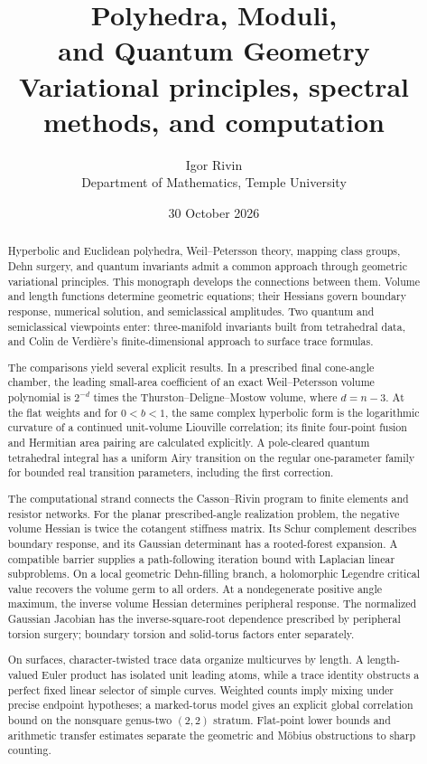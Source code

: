 \documentclass[11pt,a4paper]{article}
\title{\textbf{Polyhedra, Moduli,\\and Quantum Geometry}\\[8pt]
\large Variational principles, spectral methods, and computation}
\author{Igor Rivin\\[3pt]
\normalsize Department of Mathematics, Temple University}
\date{30 October 2026}
\numberwithin{equation}{section}
\theoremstyle{definition}
\theoremstyle{remark}
\begin{document}
\maketitle
\thispagestyle{plain}

\begin{abstract}
Hyperbolic and Euclidean polyhedra, Weil--Petersson theory, mapping class
groups, Dehn surgery, and quantum invariants admit a common approach
through geometric variational principles. This monograph develops the
connections between them. Volume and length functions determine geometric
equations; their Hessians govern boundary response, numerical solution,
and semiclassical amplitudes. Two quantum and semiclassical viewpoints
enter: three-manifold invariants built from tetrahedral data, and Colin
de Verdi\`ere's finite-dimensional approach to surface trace formulas.

The comparisons yield several explicit results. In a prescribed final
cone-angle chamber, the leading small-area coefficient of an exact
Weil--Petersson volume polynomial is $2^{-d}$ times the
Thurston--Deligne--Mostow volume, where $d=n-3$. At the flat
weights and for $0<b<1$, the same complex hyperbolic form is the logarithmic
curvature of a continued unit-volume Liouville correlation; its finite
four-point fusion and Hermitian area pairing are calculated explicitly.
A pole-cleared quantum tetrahedral integral has a uniform Airy transition
on the regular one-parameter family for bounded real transition
parameters, including the first correction.

The computational strand connects the Casson--Rivin program to finite
elements and resistor networks. For the planar prescribed-angle
realization problem, the negative volume Hessian is twice the cotangent
stiffness matrix. Its Schur complement describes boundary response, and
its Gaussian determinant has a rooted-forest expansion. A compatible
barrier supplies a path-following iteration bound with Laplacian linear
subproblems. On a local geometric Dehn-filling branch, a holomorphic
Legendre critical value recovers the volume germ to all orders. At a
nondegenerate positive angle maximum, the inverse volume Hessian determines
peripheral response. The normalized Gaussian Jacobian has the
inverse-square-root dependence prescribed by peripheral torsion surgery;
boundary torsion and solid-torus factors enter separately.

On surfaces, character-twisted trace data organize multicurves by length.
A length-valued Euler product has isolated unit leading atoms, while a
trace identity obstructs a perfect fixed linear selector of simple curves.
Weighted counts imply mixing under precise endpoint hypotheses; a
marked-torus model gives an explicit global correlation bound on the
nonsquare genus-two $(2,2)$ stratum. Flat-point lower bounds and arithmetic
transfer estimates separate the geometric and M\"obius obstructions to
sharp counting.


\end{abstract}
\end{document}
